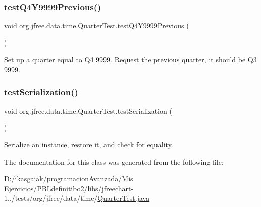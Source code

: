 \subsubsection{\texorpdfstring{test\+Q4\+Y9999\+Previous()}{testQ4Y9999Previous()}}
{\footnotesize\ttfamily void org.\+jfree.\+data.\+time.\+Quarter\+Test.\+test\+Q4\+Y9999\+Previous (\begin{DoxyParamCaption}{ }\end{DoxyParamCaption})}

Set up a quarter equal to Q4 9999. Request the previous quarter, it should be Q3 9999. \mbox{\label{classorg_1_1jfree_1_1data_1_1time_1_1_quarter_test_aac0234dc6db0d990395c2490f11e77fe}} 
\subsubsection{\texorpdfstring{test\+Serialization()}{testSerialization()}}
{\footnotesize\ttfamily void org.\+jfree.\+data.\+time.\+Quarter\+Test.\+test\+Serialization (\begin{DoxyParamCaption}{ }\end{DoxyParamCaption})}

Serialize an instance, restore it, and check for equality. 

The documentation for this class was generated from the following file\+:\begin{DoxyCompactItemize}
\item 
D\+:/ikasgaiak/programacion\+Avanzada/\+Mis Ejercicios/\+P\+B\+Ldefinitibo2/libs/jfreechart-\/1../tests/org/jfree/data/time/\mbox{\hyperlink{_quarter_test_8java}{Quarter\+Test.\+java}}\end{DoxyCompactItemize}
